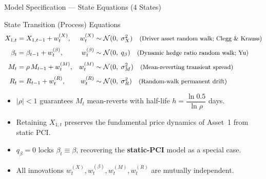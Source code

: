 \documentclass[10pt, aspectratio=169]{beamer}
\begin{document}
\begin{frame}{Model Specification --- State Equations ($4$ States)}
  \begin{block}{State Transition (Process) Equations}
    \vspace{-2pt}
    \begin{align}
      X_{1,t} &= X_{1,t-1} + w_t^{(X)},
        &w_t^{(X)} &\sim \mathcal{N}(0,\; \sigma_X^2)
        \quad \text{\small(Driver asset random walk; Clegg \& Krauss)}
        \label{eq:X1}\\[3pt]
      \beta_t &= \beta_{t-1} + w_t^{(\beta)},
        &w_t^{(\beta)} &\sim \mathcal{N}(0,\; q_\beta)
        \quad \text{\small(Dynamic hedge ratio random walk; Yu)}
        \label{eq:beta}\\[3pt]
      M_t &= \rho\, M_{t-1} + w_t^{(M)},
        &w_t^{(M)} &\sim \mathcal{N}(0,\; \sigma_M^2)
        \quad \text{\small(Mean-reverting transient spread)}
        \label{eq:M}\\[3pt]
      R_t &= R_{t-1} + w_t^{(R)},
        &w_t^{(R)} &\sim \mathcal{N}(0,\; \sigma_R^2)
        \quad \text{\small(Random-walk permanent drift)}
        \label{eq:R}
    \end{align}
  \end{block}
  \vspace{2pt}
  \begin{itemize}
    \item $|\rho| < 1$ guarantees $M_t$ mean-reverts with half-life $h = \dfrac{\ln 0.5}{\ln \rho}$ days.
    \item Retaining $X_{1,t}$ preserves the fundamental price dynamics of Asset~1 from static PCI.
    \item $q_\beta = 0$ locks $\beta_t \equiv \beta$, recovering the \textbf{static-PCI} model as a special case.
    \item All innovations $w_t^{(X)}, w_t^{(\beta)}, w_t^{(M)}, w_t^{(R)}$ are mutually independent.
  \end{itemize}
\end{frame}
\end{document}
